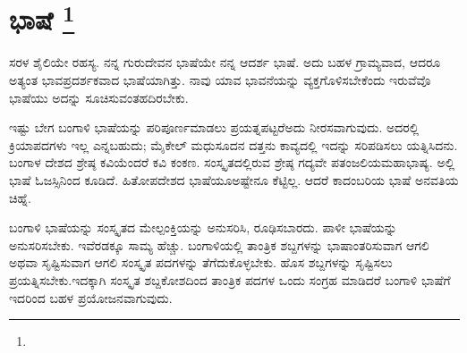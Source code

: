 
\chapter[ಭಾಷೆ ]{ಭಾಷೆ \protect\footnote{}}

ಸರಳ ಶೈಲಿಯೇ ರಹಸ್ಯ. ನನ್ನ ಗುರುದೇವನ ಭಾಷೆಯೇ ನನ್ನ ಆದರ್ಶ ಭಾಷೆ. ಅದು ಬಹಳ ಗ್ರಾಮ್ಯವಾದ, ಆದರೂ ಅತ್ಯಂತ ಭಾವಪ್ರದರ್ಶಕವಾದ ಭಾಷೆಯಾಗಿತ್ತು. ನಾವು ಯಾವ ಭಾವನೆಯನ್ನು ವ್ಯಕ್ತಗೊಳಿಸಬೇಕೆಂದು ಇರುವೆವೊ ಭಾಷೆಯು ಅದನ್ನು ಸೂಚಿಸುವಂತಹದಿರಬೇಕು.

ಇಷ್ಟು ಬೇಗ ಬಂಗಾಳಿ ಭಾಷೆಯನ್ನು ಪರಿಪೂರ್ಣಮಾಡಲು ಪ್ರಯತ್ನಪಟ್ಟರೆ\break ಅದು ನೀರಸವಾಗುವುದು. ಅದರಲ್ಲಿ ಕ್ರಿಯಾಪದಗಳು ಇಲ್ಲ ಎನ್ನಬಹುದು; ಮೈಕೇಲ್​ ಮಧುಸೂದನ ದತ್ತನು ಕಾವ್ಯದಲ್ಲಿ ಇದನ್ನು ಸರಿಪಡಿಸಲು ಯತ್ನಿಸಿದನು. ಬಂಗಾಳ ದೇಶದ ಶ್ರೇಷ್ಠ ಕವಿಯೆಂದರೆ ಕವಿ ಕಂಕಣ. ಸಂಸ್ಕೃತದಲ್ಲಿರುವ ಶ್ರೇಷ್ಠ ಗದ್ಯವೇ ಪತಂಜಲಿಯ\break ಮಹಾಭಾಷ್ಯ. ಅಲ್ಲಿ ಭಾಷೆ ಓಜಸ್ಸಿನಿಂದ ಕೂಡಿದೆ. ಹಿತೋಪದೇಶದ ಭಾಷೆಯೂ\break ಅಷ್ಟೇನೂ ಕೆಟ್ಟಿಲ್ಲ. ಆದರೆ ಕಾದಂಬರಿಯ ಭಾಷೆ ಅನವತಿಯ ಚಿಹ್ನೆ.

ಬಂಗಾಳಿ ಭಾಷೆಯನ್ನು ಸಂಸ್ಕೃತದ ಮೇಲ್ಪಂಕ್ತಿಯನ್ನು ಅನುಸರಿಸಿ, ರೂಢಿಸಬಾರದು. ಪಾಳೀ ಭಾಷೆಯನ್ನು ಅನುಸರಿಸಬೇಕು. ಇವೆರಡಕ್ಕೂ ಸಾಮ್ಯ ಹೆಚ್ಚು. ಬಂಗಾಳಿಯಲ್ಲಿ ತಾಂತ್ರಿಕ ಶಬ್ದಗಳನ್ನು ಭಾಷಾಂತರಿಸುವಾಗ ಆಗಲಿ ಅಥವಾ ಸೃಷ್ಟಿಸುವಾಗ ಆಗಲಿ ಸಂಸ್ಕೃತ ಪದಗಳನ್ನು ತೆಗೆದುಕೊಳ್ಳಬೇಕು. ಹೊಸ ಶಬ್ದಗಳನ್ನು ಸೃಷ್ಟಿಸಲು ಪ್ರಯತ್ನಿಸಬೇಕು.\break ಇದಕ್ಕಾಗಿ ಸಂಸ್ಕೃತ ಶಬ್ದಕೋಶದಿಂದ ತಾಂತ್ರಿಕ ಪದಗಳ ಒಂದು ಸಂಗ್ರಹ ಮಾಡಿದರೆ ಬಂಗಾಳಿ ಭಾಷೆಗೆ ಇದರಿಂದ ಬಹಳ ಪ್ರಯೋಜನವಾಗುವುದು.

